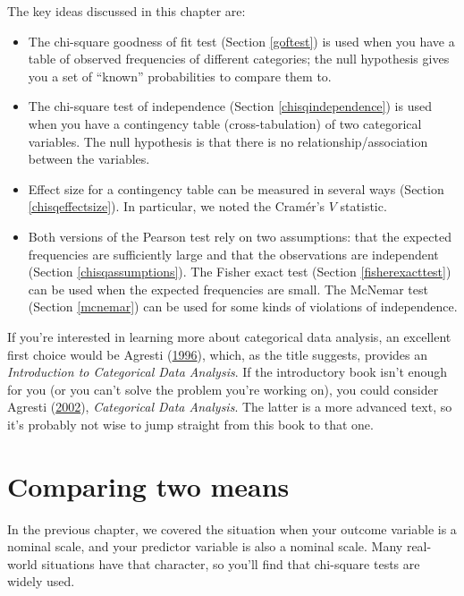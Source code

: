 \documentclass[
]{book}
\providecommand{\tightlist}{%
  \setlength{\itemsep}{0pt}\setlength{\parskip}{0pt}}
\theoremstyle{definition}
\theoremstyle{definition}
\theoremstyle{definition}
\theoremstyle{definition}
\theoremstyle{remark}
\begin{document}
The key ideas discussed in this chapter are:

\begin{itemize}
\tightlist
\item
  The chi-square goodness of fit test (Section \ref{goftest}) is used when you have a table of observed frequencies of different categories; the null hypothesis gives you a set of ``known'' probabilities to compare them to.
\item
  The chi-square test of independence (Section \ref{chisqindependence}) is used when you have a contingency table (cross-tabulation) of two categorical variables. The null hypothesis is that there is no relationship/association between the variables.
\item
  Effect size for a contingency table can be measured in several ways (Section \ref{chisqeffectsize}). In particular, we noted the Cramér's \(V\) statistic.
\item
  Both versions of the Pearson test rely on two assumptions: that the expected frequencies are sufficiently large and that the observations are independent (Section \ref{chisqassumptions}). The Fisher exact test (Section \ref{fisherexacttest}) can be used when the expected frequencies are small. The McNemar test (Section \ref{mcnemar}) can be used for some kinds of violations of independence.
\end{itemize}

If you're interested in learning more about categorical data analysis, an excellent first choice would be Agresti (\protect\hyperlink{ref-Agresti1996}{1996}), which, as the title suggests, provides an \emph{Introduction to Categorical Data Analysis}. If the introductory book isn't enough for you (or you can't solve the problem you're working on), you could consider Agresti (\protect\hyperlink{ref-Agresti2002}{2002}), \emph{Categorical Data Analysis}. The latter is a more advanced text, so it's probably not wise to jump straight from this book to that one.

\hypertarget{ttest}{%
\chapter{Comparing two means}\label{ttest}}

In the previous chapter, we covered the situation when your outcome variable is a nominal scale, and your predictor variable is also a nominal scale. Many real-world situations have that character, so you'll find that chi-square tests are widely used.
\end{document}

